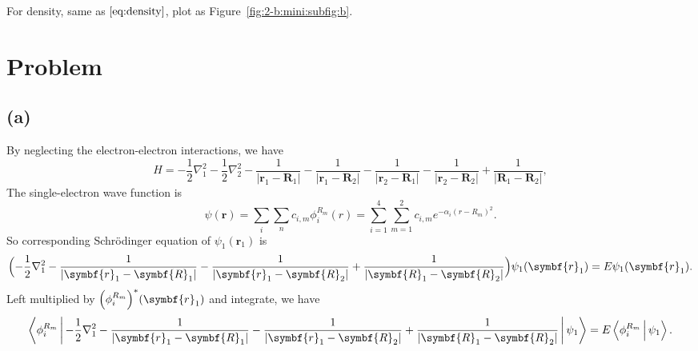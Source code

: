 \documentclass[12pt]{article}
\newcommand*{\RMN}[1]{\uppercase\expandafter{\romannumeral#1}}
\begin{document}

For density, same as $\eqref{eq:density}$, plot as Figure~\ref{fig:2-b:mini:subfig:b}.

\section{Problem \RMN{3}}

\subsection*{(a)}

By neglecting the electron-electron interactions, we have
%
\begin{equation}
    H = -\frac{1}{2}\nabla_1^2 - \frac{1}{2}\nabla_2^2
    - \frac{1}{\lvert \symbf{r}_1 - \symbf{R}_1 \rvert} - \frac{1}{\lvert \symbf{r}_1 - \symbf{R}_2 \rvert}
    - \frac{1}{\lvert \symbf{r}_2 - \symbf{R}_1 \rvert} - \frac{1}{\lvert \symbf{r}_2 - \symbf{R}_2 \rvert}
    + \frac{1}{\lvert \symbf{R}_1 - \symbf{R}_2 \rvert},
\end{equation}
%
The single-electron wave function is
%
\begin{equation}
    \psi(\symbf{r}) = \sum_{i} \sum_n c_{i, m}\phi_{i}^{R_m}(r) =
    \sum_{i=1}^{4}\sum_{m=1}^{2} c_{i, m} e^{-\alpha_i (r - R_m)^2}.
\end{equation}
%
So corresponding Schrödinger equation of $\psi_1(\symbf{r}_1)$ is
%
\begin{equation}
    \Bigl(- \frac{1}{2}\nabla_1^2
    - \frac{1}{\lvert \symbf{r}_1 - \symbf{R}_1 \rvert}
    - \frac{1}{\lvert \symbf{r}_1 - \symbf{R}_2 \rvert}
    + \frac{1}{\lvert \symbf{R}_1 - \symbf{R}_2 \rvert}
    \Bigr)
    \psi_1(\symbf{r}_1) = E \psi_1 (\symbf{r}_1).
\end{equation}
%
Left multiplied by $\Bigl( \phi_i^{R_m} \Bigr)^\ast(\symbf{r}_1)$ and integrate, we have
%
\begin{equation}
    \Braket{\phi_i^{R_m} |
        - \frac{1}{2}\nabla_1^2
        - \frac{1}{\lvert \symbf{r}_1 - \symbf{R}_1 \rvert}
        - \frac{1}{\lvert \symbf{r}_1 - \symbf{R}_2 \rvert}
        + \frac{1}{\lvert \symbf{R}_1 - \symbf{R}_2 \rvert} | \psi_1}
    = E \Braket{\phi_i^{R_m} | \psi_1}.
\end{equation}
\end{document}
